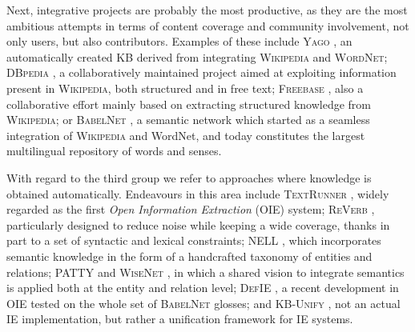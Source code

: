 Next, integrative projects are probably the most productive, as they are the most ambitious attempts in terms of content coverage and community involvement, not only users, but also contributors. Examples of these include \textsc{Yago} \citep{Suchaneketal2007}, an automatically created \textsc{KB} derived from integrating \textsc{Wikipedia} and \textsc{WordNet}; \textsc{DBpedia} \citep{Lehmanetal2014}, a collaboratively maintained project aimed at exploiting information present in \textsc{Wikipedia}, both structured and in free text; \textsc{Freebase} \citep{Bollacketal2008}, also a collaborative effort mainly based on extracting structured knowledge from \textsc{Wikipedia}; or \textsc{BabelNet} \citep{NavigliPonzetto2012}, a semantic network which started as a seamless integration of \textsc{Wikipedia} and WordNet, and today constitutes the largest multilingual repository of words and senses.

With regard to the third group we refer to approaches where knowledge is obtained automatically. 
Endeavours in this area include \textsc{TextRunner} \citep{Bankoetal2007}, widely regarded as the first \textit{Open Information Extraction} (OIE) system; \textsc{ReVerb} \citep{Fader2011}, particularly designed to reduce noise while keeping a wide coverage, thanks in part to a set of syntactic and lexical constraints; \textsc{NELL} \citep{Carlson2010}, which incorporates semantic knowledge in the form of a handcrafted taxonomy of entities and relations; \textsc{PATTY} \citep{Nakasholeetal2012} and \textsc{WiseNet} \citep{MoroandNavigli2012,MoroandNavigli2013}, in which a shared vision to integrate semantics is applied both at the entity and relation level; \textsc{DefIE} \citep{DelliBovietal2015b}, a recent development in OIE tested on the whole set of \textsc{BabelNet} glosses; and \textsc{KB-Unify} \citep{DelliBovietal2015}, not an actual IE implementation, but rather a unification framework for IE systems.


